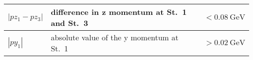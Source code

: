 \begin{table}[ht!]
\begin{tabular}{|m{4.5cm}|m{7cm}|m{3cm}|}
		$|pz_1 - pz_3|$                                                                                                                                                                              & difference in z momentum at St.~1 and St.~3                                          & $<\SI{0.08}{\GeV}$           \\ \hline
		$|py_1 |$                                                                                                                                                                                    & absolute value of the y momentum   at St.~1                                          & $>\SI{0.02}{\GeV}$           \\ \hline
	\end{tabular}
\end{table}

